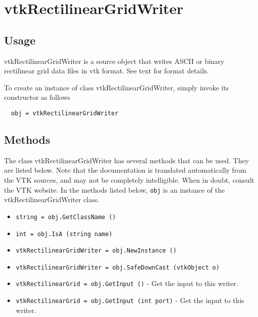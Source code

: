 \section{vtkRectilinearGridWriter}

\subsection{Usage}

 vtkRectilinearGridWriter is a source object that writes ASCII or binary 
 rectilinear grid data files in vtk format. See text for format details.

To create an instance of class vtkRectilinearGridWriter, simply
invoke its constructor as follows
\begin{verbatim}
  obj = vtkRectilinearGridWriter
\end{verbatim}
\subsection{Methods}

The class vtkRectilinearGridWriter has several methods that can be used.
  They are listed below.
Note that the documentation is translated automatically from the VTK sources,
and may not be completely intelligible.  When in doubt, consult the VTK website.
In the methods listed below, \verb|obj| is an instance of the vtkRectilinearGridWriter class.
\begin{itemize}
\item  \verb|string = obj.GetClassName ()|

\item  \verb|int = obj.IsA (string name)|

\item  \verb|vtkRectilinearGridWriter = obj.NewInstance ()|

\item  \verb|vtkRectilinearGridWriter = obj.SafeDownCast (vtkObject o)|

\item  \verb|vtkRectilinearGrid = obj.GetInput ()| -  Get the input to this writer.

\item  \verb|vtkRectilinearGrid = obj.GetInput (int port)| -  Get the input to this writer.

\end{itemize}
